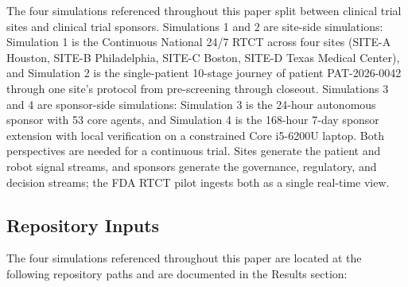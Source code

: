 The four simulations referenced throughout this paper split between
clinical trial sites and clinical trial sponsors. Simulations 1 and 2
are site-side simulations: Simulation 1 is the Continuous National
24/7 RTCT across four sites (SITE-A Houston, SITE-B Philadelphia,
SITE-C Boston, SITE-D Texas Medical Center), and Simulation 2 is the
single-patient 10-stage journey of patient PAT-2026-0042 through one
site's protocol from pre-screening through closeout. Simulations 3
and 4 are sponsor-side simulations: Simulation 3 is the 24-hour
autonomous sponsor with 53 core agents, and Simulation 4 is the
168-hour 7-day sponsor extension with local verification on a
constrained Core i5-6200U laptop. Both perspectives are needed for a
continuous trial. Sites generate the patient and robot signal streams,
and sponsors generate the governance, regulatory, and decision
streams; the FDA RTCT pilot ingests both as a single real-time view.

\subsection{Repository Inputs}
\label{sec:methods-inputs}

The four simulations referenced throughout this paper are located at
the following repository paths and are documented in the Results
section:

